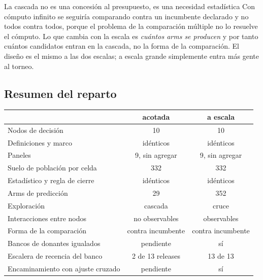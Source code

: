 \begin{aviso}{La cascada no es una concesión al presupuesto, es una necesidad estadística}
Con cómputo infinito se seguiría comparando contra un incumbente declarado y no
todos contra todos, porque el problema de la comparación múltiple no lo resuelve el
cómputo. Lo que cambia con la escala es \emph{cuántos arms se producen} y por tanto
cuántos candidatos entran en la cascada, no la forma de la comparación. El diseño
es el mismo a las dos escalas; a escala grande simplemente entra más gente al
torneo.
\end{aviso}

\subsection{Resumen del reparto}

\begin{center}
\begin{tabularx}{\linewidth}{@{}X c c@{}}
\toprule
 & acotada & a escala\\
\midrule
Nodos de decisión                & 10 & 10\\
Definiciones y marco             & idénticos & idénticos\\
Paneles                          & 9, sin agregar & 9, sin agregar\\
Suelo de población por celda     & 332 & 332\\
Estadístico y regla de cierre    & idénticos & idénticos\\
\midrule
Arms de predicción               & 29 & 352\\
Exploración                      & cascada & cruce\\
Interacciones entre nodos        & no observables & observables\\
Forma de la comparación          & contra incumbente & contra incumbente\\
Bancos de donantes igualados     & pendiente & sí\\
Escalera de recencia del banco   & 2 de 13 releases & 13 de 13\\
Encaminamiento con ajuste cruzado& pendiente & sí\\
\bottomrule
\end{tabularx}
\end{center}
